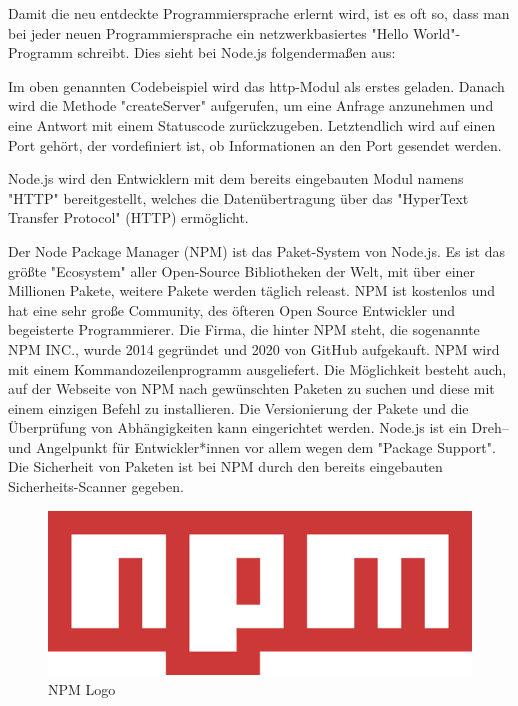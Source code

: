 
Damit die neu entdeckte Programmiersprache erlernt wird, ist es oft so, dass man bei jeder neuen Programmiersprache ein netzwerkbasiertes "Hello World"-Programm schreibt. Dies sieht bei Node.js folgendermaßen aus:


Im oben genannten Codebeispiel wird das http-Modul als erstes geladen. Danach wird die Methode "createServer" aufgerufen, um eine Anfrage anzunehmen und eine Antwort mit einem Statuscode zurückzugeben. Letztendlich wird auf einen Port gehört, der vordefiniert ist, ob Informationen an den Port gesendet werden.

Node.js wird den Entwicklern mit dem bereits eingebauten Modul namens "HTTP" bereitgestellt, welches die Datenübertragung über das "HyperText Transfer Protocol" (HTTP) ermöglicht. \cite{HelloWorld}

\label{sec:npm}

Der Node Package Manager (NPM) ist das Paket-System von Node.js. Es ist das größte "Ecosystem" aller Open-Source Bibliotheken der Welt, mit über einer Millionen Pakete, weitere Pakete werden täglich releast. NPM ist kostenlos und hat eine sehr große Community, des öfteren Open Source Entwickler und begeisterte Programmierer. Die Firma, die hinter NPM steht, die sogenannte NPM INC., wurde 2014 gegründet und 2020 von GitHub aufgekauft.
NPM wird mit einem Kommandozeilenprogramm ausgeliefert. Die Möglichkeit besteht auch, auf der Webseite von NPM nach gewünschten Paketen zu suchen und diese mit einem einzigen Befehl zu installieren. Die Versionierung der Pakete und die Überprüfung von Abhängigkeiten kann eingerichtet werden. Node.js ist ein Dreh– und Angelpunkt für Entwickler*innen vor allem wegen dem "Package Support".
Die Sicherheit von Paketen ist bei NPM durch den bereits eingebauten Sicherheits-Scanner gegeben\cite{NPM}\cite{NPM2}\cite{NPMIntro}.

\begin{figure}[H]
    \centering
    \includegraphics{media/NodeJs/NPM.png}
    \caption{NPM Logo \cite{NPMLOGO}}
\end{figure}


